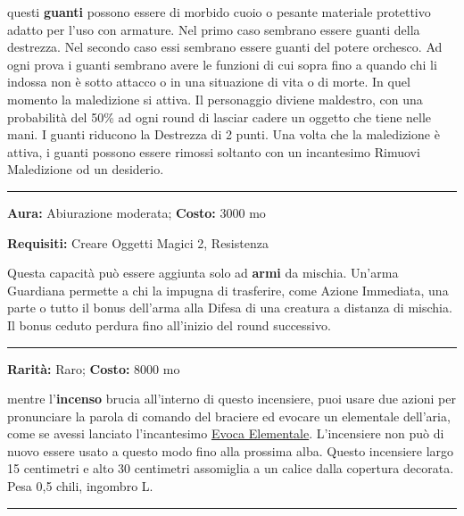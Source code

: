 \begin{multicols}{2}
questi \textbf{guanti} possono essere di morbido cuoio o pesante materiale protettivo adatto per l'uso con armature. Nel primo caso sembrano essere guanti della destrezza. Nel secondo caso essi sembrano essere guanti del potere orchesco. Ad ogni prova i guanti sembrano avere le funzioni di cui sopra fino a quando chi li indossa non è sotto attacco o in una situazione di vita o di morte. In quel momento la maledizione si attiva. Il personaggio diviene maldestro, con una probabilità del 50\% ad ogni round di lasciar cadere un oggetto che tiene nelle mani. I guanti riducono la Destrezza di 2 punti. Una volta che la maledizione è attiva, i guanti possono essere rimossi soltanto con un incantesimo Rimuovi Maledizione od un desiderio.

\smallskip\noindent\rule{\linewidth}{2pt}  \hypertarget{Guardiana}{}\smallskip{}\noindent\label{Guardiana}

\textbf{Aura:} Abiurazione moderata; \textbf{Costo:} 3000 mo

\textbf{Requisiti:} Creare Oggetti Magici 2, Resistenza

Questa capacità può essere aggiunta solo ad \textbf{armi} da mischia. Un'arma Guardiana permette a chi la impugna di trasferire, come Azione Immediata, una parte o tutto il bonus dell'arma alla Difesa di una creatura a distanza di mischia. Il bonus ceduto perdura fino all'inizio del round successivo.

\smallskip\noindent\rule{\linewidth}{2pt}  \hypertarget{IncensieredegliElementalidell'Aria}{}\smallskip{}\noindent\label{IncensieredegliElementalidell'Aria}

\textbf{Rarità:} Raro; \textbf{Costo:} 8000 mo

mentre l'\textbf{incenso} brucia all'interno di questo incensiere, puoi usare due azioni per pronunciare la parola di comando del braciere ed evocare un elementale dell'aria, come se avessi lanciato l'incantesimo \hyperlink{Evoca Elementale}{Evoca Elementale}. L'incensiere non può di nuovo essere usato a questo modo fino alla prossima alba. Questo incensiere largo 15 centimetri e alto 30 centimetri assomiglia a un calice dalla copertura decorata. Pesa 0,5 chili, ingombro L.

\smallskip\noindent\rule{\linewidth}{2pt}  \hypertarget{Incensodell'Ossessione}{}\smallskip{}\noindent\label{Incensodell'Ossessione}


\end{multicols}
